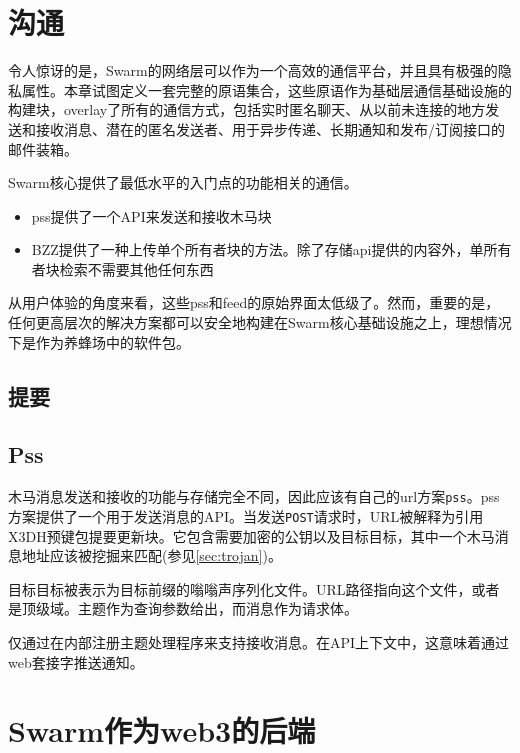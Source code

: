 \section{沟通\statusred}\label{sec:messaging}


令人惊讶的是，Swarm的网络层可以作为一个高效的通信平台，并且具有极强的隐私属性。本章试图定义一套完整的原语集合，这些原语作为基础层通信基础设施的构建块，overlay了所有的通信方式，包括实时匿名聊天、从以前未连接的地方发送和接收消息、潜在的匿名发送者、用于异步传递、长期通知和发布/订阅接口的邮件装箱。

Swarm核心提供了最低水平的入门点的功能相关的通信。

\begin{itemize}
    \item pss提供了一个API来发送和接收木马块
    \item BZZ提供了一种上传单个所有者块的方法。除了存储api提供的内容外，单所有者块检索不需要其他任何东西
\end{itemize}



从用户体验的角度来看，这些pss和feed的原始界面太低级了。然而，重要的是，任何更高层次的解决方案都可以安全地构建在Swarm核心基础设施之上，理想情况下是作为养蜂场中的软件包。

\subsection{提要\statusorange}\label{sec:feeds-ux}


\subsection{Pss \statusorange}\label{sec:pss-ux}

木马消息发送和接收的功能与存储完全不同，因此应该有自己的url方案\lstinline{pss}。pss方案提供了一个用于发送消息的API。当发送\lstinline{POST}请求时，URL被解释为引用X3DH预键包提要更新块。它包含需要加密的公钥以及目标目标，其中一个木马消息地址应该被挖掘来匹配(参见\ref{sec:trojan})。

目标目标被表示为目标前缀的嗡嗡声序列化文件。URL路径指向这个文件，或者是顶级域。主题作为查询参数给出，而消息作为请求体。

仅通过在内部注册主题处理程序来支持接收消息。在API上下文中，这意味着通过web套接字推送通知。



\section{Swarm作为web3的后端 \statusred}\label{sec:buzz-apiary}

